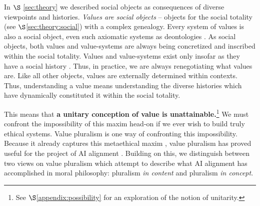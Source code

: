 In $\S$ \ref{sec:theory} we described social objects as consequences of diverse viewpoints and histories.
\textit{Values are social objects} -- objects for the social totality (see $\S$\ref{sec:theory:social}) with a complex genealogy.
Every system of values is also a social object, even such axiomatic systems as deontologies \citep{Kant:CritiquePureReason}. As social objects, both values and value-systems are always being concretized and inscribed within the social totality. Values and value-systems exist only insofar as they have a social history \citep{Nietzsche:GenealogyMorals,Scheler:Ressentiment}.
Thus, in practice, we are always renegotiating what values are.
Like all other objects, values are externally determined within contexts.
Thus, understanding a value means understanding the diverse histories which have dynamically constituted it within the social totality.

This means that \textbf{a unitary conception of value is unattainable.}\footnote{See $\S$\ref{appendix:possibility} for an exploration of the notion of unitarity.}
We must confront the impossibility of this maxim head-on if we ever wish to build truly ethical systems.
Value pluralism is one way of confronting this impossibility. Because it already captures this metaethical maxim \citep{Berlin:FourEssaysLiberty, Rawls:TheoryJustice}, value pluralism has proved useful for the project of AI alignment \citep{Sorensen:ValueKaleidoscope,Marchese_2022}. %
Building on this, we distinguish between two views on value pluralism which attempt to describe what AI alignment has accomplished in moral philosophy: pluralism \textit{in content} and pluralism \textit{in concept}.

